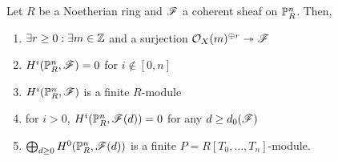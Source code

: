 \documentclass[12pt]{article}
\begin{document}
\begin{prop}
Let $R$ be a Noetherian ring and $\F$ a coherent sheaf on $\P^n_R$. Then,
\begin{enumerate}
\item $\exists r \ge 0 : \exists m \in \Z$ and a surjection $\struct{X}(m)^{\oplus r} \onto \F$
\item $H^i(\P^n_R, \F) = 0$ for $i \notin [0, n]$
\item $H^i(\P^n_R, \F)$ is a finite $R$-module
\item for $i > 0$, $H^i(\P^n_R, \F(d)) = 0$ for any $d \ge d_0(\F)$
\item $\bigoplus_{d \ge 0} H^0(\P^n_R, \F(d))$ is a finite $P = R[T_0, \dots, T_n]$-module.
\end{enumerate}
\end{prop}
\end{document}
